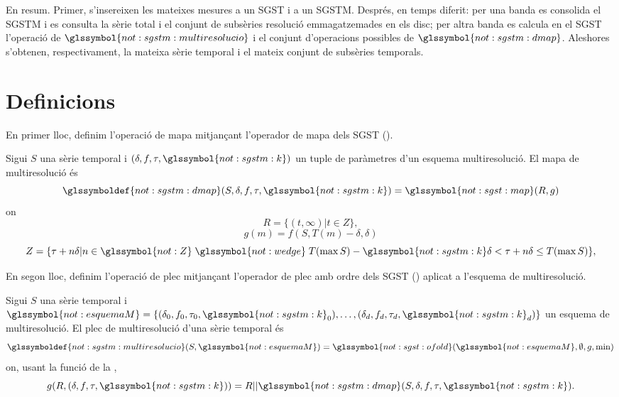 En resum. Primer, s'insereixen les mateixes mesures a un \gls{SGST} i
a un \gls{SGSTM}. Després, en temps diferit: per una banda es
consolida el \gls{SGSTM} i es consulta la sèrie total i el conjunt de
subsèries resolució emmagatzemades en els disc; per altra banda es
calcula en el \gls{SGST} l'operació de
$\glssymbol{not:sgstm:multiresolucio}$ i el conjunt d'operacions
possibles de $\glssymbol{not:sgstm:dmap}$. Aleshores s'obtenen,
respectivament, la mateixa sèrie temporal i el mateix conjunt de
subsèries temporals.





\section{Definicions}

En primer lloc, definim l'operació de mapa mitjançant l'operador de
mapa dels \gls{SGST} ().


\begin{definition}
\label{def:multiresolucio:mapmu}
Sigui $S$ una sèrie temporal i
$(\delta,f,\tau,\glssymbol{not:sgstm:k})$ un tuple de paràmetres d'un
esquema multiresolució. El mapa de multiresolució és
\[
\glssymboldef{not:sgstm:dmap}(S,\delta,f,\tau,\glssymbol{not:sgstm:k})=
\glssymbol{not:sgst:map}(R,g)\]
 on
  \[
  R = \{ (t,\infty) | t\in Z  \},
  \]
  \[
  g(m)=f(S, T(m)-\delta,\delta) %
  \]
 \[
 Z = \{ \tau+n\delta | n\in\glssymbol{not:Z}\;
 \glssymbol{not:wedge}\; T(\max S) - \glssymbol{not:sgstm:k}\delta <
 \tau+n\delta \leq T(\max S) \},
 \]

\end{definition}




En segon lloc, definim l'operació de plec mitjançant l'operador de
plec amb ordre dels \gls{SGST} () aplicat a
l'esquema de multiresolució.


\begin{definition}
  \label{def:multiresolucio:plecmu}
  Sigui $S$ una sèrie temporal i $\glssymbol{not:esquemaM} = \{
  (\delta_0,f_0,\tau_0,\glssymbol{not:sgstm:k}_0), \ldots,
  (\delta_d,f_d,\tau_d,\glssymbol{not:sgstm:k}_d)\}$ un esquema de
  multiresolució. El plec de multiresolució d'una sèrie
  temporal és 
  \[
  \glssymboldef{not:sgstm:multiresolucio}(S,\glssymbol{not:esquemaM})=
  \glssymbol{not:sgst:ofold}(\glssymbol{not:esquemaM},\emptyset,g,\min)
  \]
  on, usant la funció de la ,
  \[
  g(R,(\delta,f,\tau,\glssymbol{not:sgstm:k}))= R ||
  \glssymbol{not:sgstm:dmap}(S,\delta,f,\tau,\glssymbol{not:sgstm:k}).
  \]
\end{definition}

